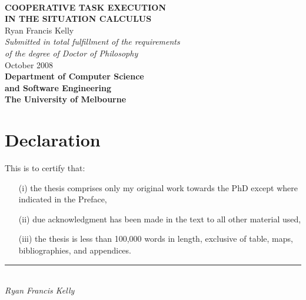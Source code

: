 %
%
%
%






\begin{titlepage}
\begin{center}
\ \\
\vspace{3cm}
{\bf\LARGE  COOPERATIVE TASK EXECUTION }\\ \vspace{0.5cm} %
{\bf\LARGE  IN THE SITUATION CALCULUS } \\ %
\vspace{2cm}
{\LARGE      Ryan Francis Kelly       }\\
\vspace{5cm}
{\em\large Submitted in total fulfillment of the requirements}\\ \vspace{0.1cm}
{\em\large        of the degree of Doctor of Philosophy     }\\
\vspace{0.5cm}
{\Large             October 2008        }\\
\vspace{2.5cm}
{\bf\large Department of Computer Science\\ and Software Engineering}\\ \vspace{0.5cm}
{\bf\Large        The University of Melbourne     }\\
\vspace{0.5cm}
\end{center}
\end{titlepage}
\cleardoublepage     %





\chapter*{Declaration}
This is to certify that:
\begin{itemize}
\item[(i)] the thesis comprises only my original work towards the PhD except where indicated in the Preface,
\item[(ii)] due acknowledgment has been made in the text to all other material used,
\item[(iii)] the thesis is less than 100,000 words in length, exclusive of table, maps, bibliographies, and appendices.
\end{itemize}
\vspace{3cm}
\rule{70mm}{0.1mm}\\
\emph{Ryan Francis Kelly}

